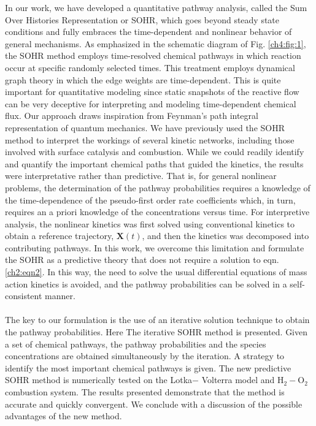 In our work, we have developed a quantitative pathway
analysis, called the Sum Over Histories Representation or
SOHR, which goes beyond steady state conditions and fully
embraces the time-dependent and nonlinear behavior of
general mechanisms. As emphasized in the schematic diagram
of Fig. \ref{ch4:fig:1}, the SOHR method employs time-resolved chemical pathways in which reaction occur at specific randomly selected
times. This treatment employs dynamical graph theory\cite{ch4_25_harary1997dynamic} in
which the edge weights are time-dependent. This is quite
important for quantitative modeling since static snapshots of
the reactive flow can be very deceptive for interpreting and
modeling time-dependent chemical flux. Our approach draws
inspiration from Feynman’s path integral representation of
quantum mechanics.\cite{ch4_26_feynman2010quantum} We have previously used the SOHR
method to interpret the workings of several kinetic networks,
including those involved with surface catalysis and combustion.
While we could readily identify and quantify the important
chemical paths that guided the kinetics, the results were
interpretative rather than predictive. That is, for general
nonlinear problems, the determination of the pathway
probabilities requires a knowledge of the time-dependence of
the pseudo-first order rate coefficients which, in turn, requires
an a priori knowledge of the concentrations versus time. For
interpretive analysis, the nonlinear kinetics was first solved
using conventional kinetics to obtain a reference trajectory,
$\mathbf{X}(t)$, and then the kinetics was decomposed into contributing
pathways. In this work, we overcome this limitation and formulate the SOHR as a predictive theory that does not
require a solution to eqn. \ref{ch2:eqn2}. In this way, the need to solve the
usual differential equations of mass action kinetics is avoided,
and the pathway probabilities can be solved in a self-consistent
manner.
\newline
\paragraph{}
The key to our formulation is the use of an iterative solution
technique to obtain the pathway probabilities. Here The iterative SOHR
method is presented. Given a set of chemical pathways, the
pathway probabilities and the species concentrations are
obtained simultaneously by the iteration. A strategy to identify
the most important chemical pathways is given. The new
predictive SOHR method is numerically tested on the Lotka$−$
Volterra model and H$_2-$O$_2$ combustion system. The results
presented demonstrate that the method is accurate and quickly
convergent. We conclude with a discussion of the possible
advantages of the new method.
